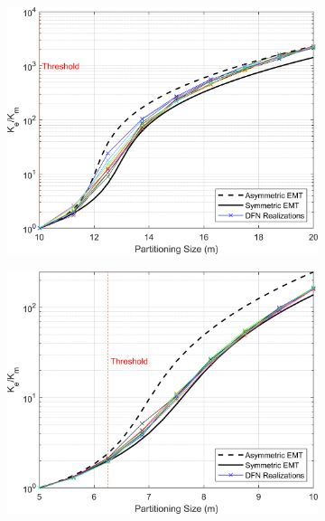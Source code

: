 \documentclass[Supplementary.tex]{subfiles}
\begin{document}
\begin{figure}[ht]
\begin{subfigure}{0.3\textwidth}
        \includegraphics[width=\textwidth]{FSU/Plot_FSU_Case_07_nohead.png}
        \label{fig:FSU_7}
    \end{subfigure}
    \begin{subfigure}{0.3\textwidth}
        \includegraphics[width=\textwidth]{FSU/Plot_FSU_Case_08_nohead.png}
        \label{fig:FSU_8}
    \end{subfigure}
    \begin{subfigure}{0.3\textwidth}

\end{subfigure}
\end{figure}
\end{document}
